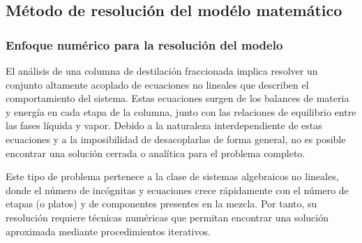 \subsection{Método de resolución del modélo matemático}
\subsubsection{Enfoque numérico para la resolución del modelo}
El análisis de una columna de destilación fraccionada implica resolver un conjunto altamente acoplado de ecuaciones no lineales que describen el comportamiento del sistema. Estas ecuaciones surgen de los balances de materia y energía en cada etapa de la columna, junto con las relaciones de equilibrio entre las fases líquida y vapor. Debido a la naturaleza interdependiente de estas ecuaciones y a la imposibilidad de desacoplarlas de forma general, no es posible encontrar una solución cerrada o analítica para el problema completo.

Este tipo de problema pertenece a la clase de sistemas algebraicos no lineales, donde el número de incógnitas y ecuaciones crece rápidamente con el número de etapas (o platos) y de componentes presentes en la mezcla. Por tanto, su resolución requiere técnicas numéricas que permitan encontrar una solución aproximada mediante procedimientos iterativos.

